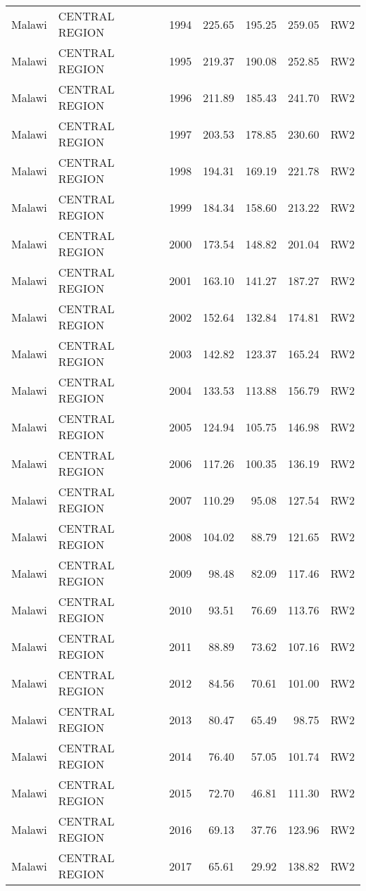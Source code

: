 \begin{longtable}{lllrrrl}
  Malawi & CENTRAL REGION & 1994 & 225.65 & 195.25 & 259.05 & RW2 \\ 
  Malawi & CENTRAL REGION & 1995 & 219.37 & 190.08 & 252.85 & RW2 \\ 
  Malawi & CENTRAL REGION & 1996 & 211.89 & 185.43 & 241.70 & RW2 \\ 
  Malawi & CENTRAL REGION & 1997 & 203.53 & 178.85 & 230.60 & RW2 \\ 
  Malawi & CENTRAL REGION & 1998 & 194.31 & 169.19 & 221.78 & RW2 \\ 
  Malawi & CENTRAL REGION & 1999 & 184.34 & 158.60 & 213.22 & RW2 \\ 
  Malawi & CENTRAL REGION & 2000 & 173.54 & 148.82 & 201.04 & RW2 \\ 
  Malawi & CENTRAL REGION & 2001 & 163.10 & 141.27 & 187.27 & RW2 \\ 
  Malawi & CENTRAL REGION & 2002 & 152.64 & 132.84 & 174.81 & RW2 \\ 
  Malawi & CENTRAL REGION & 2003 & 142.82 & 123.37 & 165.24 & RW2 \\ 
  Malawi & CENTRAL REGION & 2004 & 133.53 & 113.88 & 156.79 & RW2 \\ 
  Malawi & CENTRAL REGION & 2005 & 124.94 & 105.75 & 146.98 & RW2 \\ 
  Malawi & CENTRAL REGION & 2006 & 117.26 & 100.35 & 136.19 & RW2 \\ 
  Malawi & CENTRAL REGION & 2007 & 110.29 & 95.08 & 127.54 & RW2 \\ 
  Malawi & CENTRAL REGION & 2008 & 104.02 & 88.79 & 121.65 & RW2 \\ 
  Malawi & CENTRAL REGION & 2009 & 98.48 & 82.09 & 117.46 & RW2 \\ 
  Malawi & CENTRAL REGION & 2010 & 93.51 & 76.69 & 113.76 & RW2 \\ 
  Malawi & CENTRAL REGION & 2011 & 88.89 & 73.62 & 107.16 & RW2 \\ 
  Malawi & CENTRAL REGION & 2012 & 84.56 & 70.61 & 101.00 & RW2 \\ 
  Malawi & CENTRAL REGION & 2013 & 80.47 & 65.49 & 98.75 & RW2 \\ 
  Malawi & CENTRAL REGION & 2014 & 76.40 & 57.05 & 101.74 & RW2 \\ 
  Malawi & CENTRAL REGION & 2015 & 72.70 & 46.81 & 111.30 & RW2 \\ 
  Malawi & CENTRAL REGION & 2016 & 69.13 & 37.76 & 123.96 & RW2 \\ 
  Malawi & CENTRAL REGION & 2017 & 65.61 & 29.92 & 138.82 & RW2 \\ 

\end{longtable}
